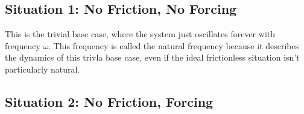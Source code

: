 \documentclass[fleqn,letterpaper]{report}
\begin{document}
\subsection{Situation 1: No Friction, No Forcing}
\label{no-friction-no-forcing}

This is the trivial base case, where the system just
oscillates forever with frequency $\omega$. This frequency is
called the natural frequency because it describes the dynamics
of this trivla base case, even if the ideal frictionless
situation isn't particularly natural.

\subsection{Situation 2: No Friction, Forcing} 
\label{no-friction-forcing}
\end{document}
